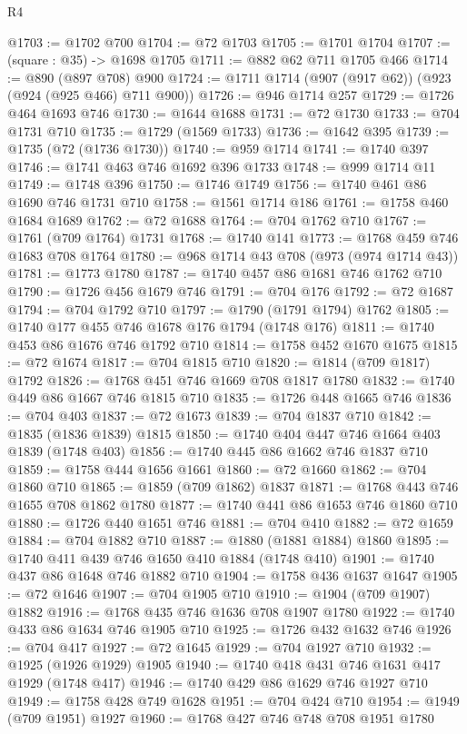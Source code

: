 \begin{lexlean}{R4}
\begin{coremodule}
@1703 := @1702 @700
@1704 := @72 @1703
@1705 := @1701 @1704
@1707 := (square : @35) -> @1698 @1705
@1711 := @882 @62 @711 @1705 @466
@1714 := @890 (@897 @708) @900
@1724 := @1711 @1714 (@907 (@917 @62)) (@923 (@924 (@925 @466) @711 @900))
@1726 := @946 @1714 @257
@1729 := @1726 @464 @1693 @746
@1730 := @1644 @1688
@1731 := @72 @1730
@1733 := @704 @1731 @710
@1735 := @1729 (@1569 @1733)
@1736 := @1642 @395
@1739 := @1735 (@72 (@1736 @1730))
@1740 := @959 @1714
@1741 := @1740 @397
@1746 := @1741 @463 @746 @1692 @396 @1733
@1748 := @999 @1714 @11
@1749 := @1748 @396
@1750 := @1746 @1749
@1756 := @1740 @461 @86 @1690 @746 @1731 @710
@1758 := @1561 @1714 @186
@1761 := @1758 @460 @1684 @1689
@1762 := @72 @1688
@1764 := @704 @1762 @710
@1767 := @1761 (@709 @1764) @1731
@1768 := @1740 @141
@1773 := @1768 @459 @746 @1683 @708 @1764
@1780 := @968 @1714 @43 @708 (@973 (@974 @1714 @43))
@1781 := @1773 @1780
@1787 := @1740 @457 @86 @1681 @746 @1762 @710
@1790 := @1726 @456 @1679 @746
@1791 := @704 @176
@1792 := @72 @1687
@1794 := @704 @1792 @710
@1797 := @1790 (@1791 @1794) @1762
@1805 := @1740 @177 @455 @746 @1678 @176 @1794 (@1748 @176)
@1811 := @1740 @453 @86 @1676 @746 @1792 @710
@1814 := @1758 @452 @1670 @1675
@1815 := @72 @1674
@1817 := @704 @1815 @710
@1820 := @1814 (@709 @1817) @1792
@1826 := @1768 @451 @746 @1669 @708 @1817 @1780
@1832 := @1740 @449 @86 @1667 @746 @1815 @710
@1835 := @1726 @448 @1665 @746
@1836 := @704 @403
@1837 := @72 @1673
@1839 := @704 @1837 @710
@1842 := @1835 (@1836 @1839) @1815
@1850 := @1740 @404 @447 @746 @1664 @403 @1839 (@1748 @403)
@1856 := @1740 @445 @86 @1662 @746 @1837 @710
@1859 := @1758 @444 @1656 @1661
@1860 := @72 @1660
@1862 := @704 @1860 @710
@1865 := @1859 (@709 @1862) @1837
@1871 := @1768 @443 @746 @1655 @708 @1862 @1780
@1877 := @1740 @441 @86 @1653 @746 @1860 @710
@1880 := @1726 @440 @1651 @746
@1881 := @704 @410
@1882 := @72 @1659
@1884 := @704 @1882 @710
@1887 := @1880 (@1881 @1884) @1860
@1895 := @1740 @411 @439 @746 @1650 @410 @1884 (@1748 @410)
@1901 := @1740 @437 @86 @1648 @746 @1882 @710
@1904 := @1758 @436 @1637 @1647
@1905 := @72 @1646
@1907 := @704 @1905 @710
@1910 := @1904 (@709 @1907) @1882
@1916 := @1768 @435 @746 @1636 @708 @1907 @1780
@1922 := @1740 @433 @86 @1634 @746 @1905 @710
@1925 := @1726 @432 @1632 @746
@1926 := @704 @417
@1927 := @72 @1645
@1929 := @704 @1927 @710
@1932 := @1925 (@1926 @1929) @1905
@1940 := @1740 @418 @431 @746 @1631 @417 @1929 (@1748 @417)
@1946 := @1740 @429 @86 @1629 @746 @1927 @710
@1949 := @1758 @428 @749 @1628
@1951 := @704 @424 @710
@1954 := @1949 (@709 @1951) @1927
@1960 := @1768 @427 @746 @748 @708 @1951 @1780

\end{coremodule}
\end{lexlean}
